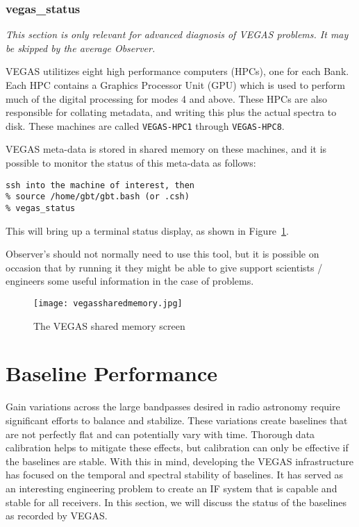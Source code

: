 \subsubsection{vegas\_status}\label{sec:vegas_status}
{\it This section is only relevant for advanced diagnosis of VEGAS problems.
It may be skipped by the average Observer.}

VEGAS utilitizes eight high performance computers (HPCs), one for each Bank.
Each HPC contains a Graphics Processor Unit (GPU) which is used to perform
much of the digital processing for modes 4 and above. These HPCs are also
responsible for collating metadata, and writing this plus the actual spectra to
disk. These machines are called {\tt VEGAS-HPC1} through {\tt VEGAS-HPC8}.

VEGAS meta-data is stored in shared memory on these machines, and it is 
possible to monitor the status of this meta-data as follows:

\begin{verbatim}
ssh into the machine of interest, then
% source /home/gbt/gbt.bash (or .csh)
% vegas_status
\end{verbatim}

This will bring up a terminal status display, as shown in 
Figure~\ref{fig:vegas_status}.

Observer's should not normally need to use this tool, but it is possible on
occasion that by running it they might be able to give support scientists /
engineers some useful information in the case of problems.

\begin{figure}[!h]
\begin{center}
\texttt{[image: vegassharedmemory.jpg]}
\caption[The VEGAS shared memory screen]{The VEGAS shared memory screen}
\label{fig:vegas_status} 
\end{center}
\end{figure}

\section{Baseline Performance}\label{sec:vegas_baselines}

Gain variations across the large bandpasses desired in radio astronomy 
require significant efforts to balance and stabilize. These variations 
create baselines that are not perfectly flat and can potentially vary with 
time. Thorough data calibration helps to mitigate these effects, but 
calibration can only be effective if the baselines are stable. 
With this in mind, developing the VEGAS infrastructure has focused on the 
temporal and spectral stability of baselines. It has served as an 
interesting engineering problem to create an IF system that is capable and 
stable for all receivers. In this section, we will discuss the status of 
the baselines as recorded by VEGAS.


